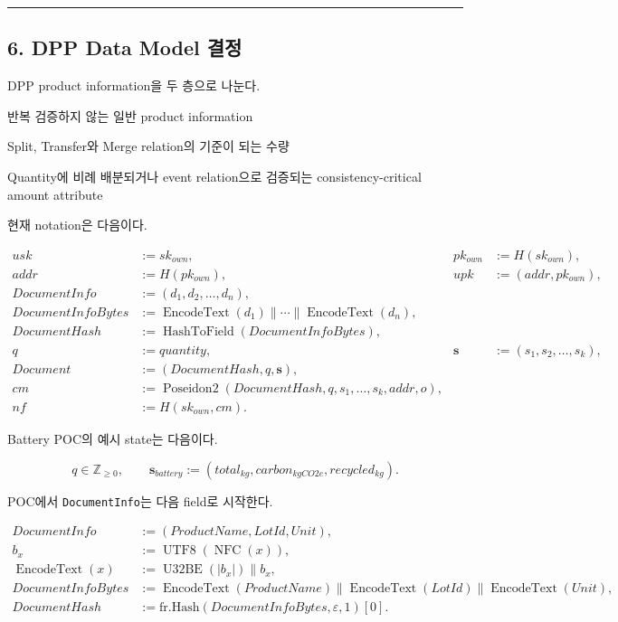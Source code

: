 \documentclass[11pt]{extarticle}
\DeclareMathOperator{\HashToField}{HashToField}
\DeclareMathOperator{\PoseidonTwo}{Poseidon2}
\begin{document}
\begin{center}\rule{0.5\linewidth}{0.5pt}\end{center}

\subsection{6. DPP Data Model 결정}\label{6-dpp-data-model-uxacb0uxc815}

DPP product information을 두 층으로 나눈다.

\begin{description}[leftmargin=31mm,style=nextline]
  \item[DocumentInfo] 반복 검증하지 않는 일반 product information
  \item[quantity] Split, Transfer와 Merge relation의 기준이 되는 수량
  \item[StateVector] Quantity에 비례 배분되거나 event relation으로 검증되는
  consistency-critical amount attribute
\end{description}

현재 notation은 다음이다.

\[
\begin{aligned}
usk &:= sk_{own}, & pk_{own} &:= H(sk_{own}),\\
addr &:= H(pk_{own}), & upk &:= (addr,pk_{own}),\\[2pt]
\mathit{DocumentInfo} &:= (d_1,d_2,\ldots,d_n),\\
\mathit{DocumentInfoBytes} &:=
\operatorname{EncodeText}(d_1)\mathbin{\|}\cdots\mathbin{\|}\operatorname{EncodeText}(d_n),\\
\mathit{DocumentHash} &:= \HashToField(\mathit{DocumentInfoBytes}),\\[2pt]
q &:= \mathit{quantity}, & \mathbf{s} &:= (s_1,s_2,\ldots,s_k),\\
\mathit{Document} &:= (\mathit{DocumentHash},q,\mathbf{s}),\\
cm &:= \PoseidonTwo(\mathit{DocumentHash},q,s_1,\ldots,s_k,addr,o),\\
nf &:= H(sk_{own},cm).
\end{aligned}
\]

Battery POC의 예시 state는 다음이다.

\[
q\in\mathbb{Z}_{\geq 0},
\qquad
\mathbf{s}_{battery}:=(total_{kg},carbon_{kgCO2e},recycled_{kg}).
\]

POC에서 \texttt{DocumentInfo}는 다음 field로 시작한다.

\[
\begin{aligned}
\mathit{DocumentInfo} &:= (\mathit{ProductName},\mathit{LotId},\mathit{Unit}),\\
b_x &:= \operatorname{UTF8}(\operatorname{NFC}(x)),\\
\operatorname{EncodeText}(x) &:={}
\operatorname{U32BE}(|b_x|)\mathbin{\|}b_x,\\
\mathit{DocumentInfoBytes} &:={}
\operatorname{EncodeText}(\mathit{ProductName})
\mathbin{\|}\operatorname{EncodeText}(\mathit{LotId})
\mathbin{\|}\operatorname{EncodeText}(\mathit{Unit}),\\
\mathit{DocumentHash} &:= \mathrm{fr.Hash}(\mathit{DocumentInfoBytes},\varepsilon,1)[0].
\end{aligned}
\]
\end{document}
